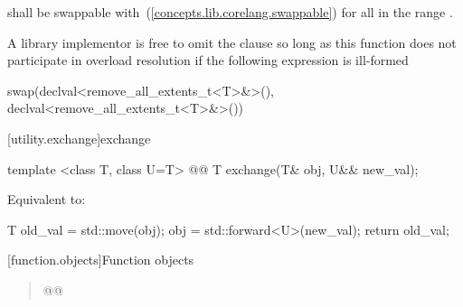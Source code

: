 \begin{itemdescr}
\pnum
\requires
{} shall be swappable with~(\ref{concepts.lib.corelang.swappable}) 
for all  in the range .

{\color{newclr}
\pnum
\remark
A library implementor is free to omit the  clause so long as
this function does not participate in overload resolution if the following
expression is ill-formed
\begin{codeblock}
swap(declval<remove_all_extents_t<T>&>(), declval<remove_all_extents_t<T>&>())
\end{codeblock}
}

\pnum
\effects {}
\end{itemdescr}

[utility.exchange]{exchange}

\begin{itemdecl}
template <class T, class U=T>
  @@
T exchange(T& obj, U&& new_val);
\end{itemdecl}

\begin{itemdescr}
\pnum
\effects
Equivalent to:

\begin{codeblock}
T old_val = std::move(obj);
obj = std::forward<U>(new_val);
return old_val;
\end{codeblock}
\end{itemdescr}


\setcounter{section}{8}
[function.objects]{Function objects}


\begin{quote}
\setcounter{Paras}{1}
\pnum
{}

\begin{codeblock}
  @@
\end{codeblock}
\end{quote}


